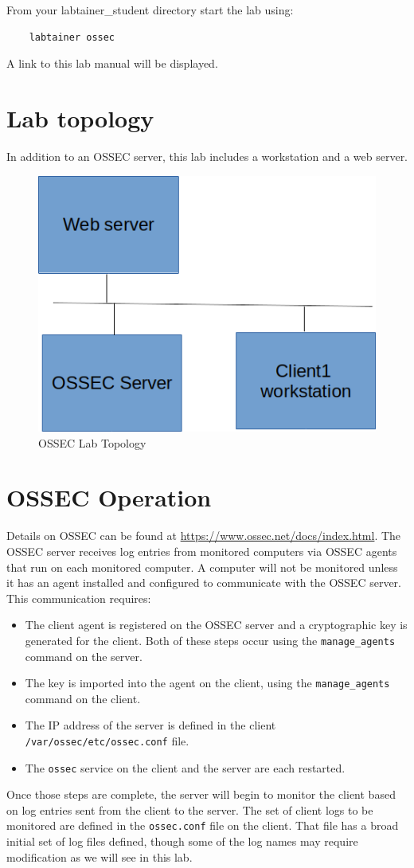 From your labtainer_student directory start the lab using:
\begin{verbatim}
    labtainer ossec
\end{verbatim}
A link to this lab manual will be displayed.

\section{Lab topology}
In addition to an OSSEC server, this lab includes a workstation and a web server.

\begin{figure}[H]
\begin{center}
\includegraphics [width=0.8\linewidth]{ossec.png}
\end{center}
\caption{OSSEC Lab Topology}
\label{fig:topology}
\end{figure}

\section{OSSEC Operation}
Details on OSSEC can be found at \url{https://www.ossec.net/docs/index.html}.
The OSSEC server receives log entries from monitored computers via OSSEC agents that run on each monitored computer.  
A computer will not be monitored unless it has an agent installed and configured to communicate with the OSSEC server.
This communication requires:
\begin{itemize}
\item The client agent is registered on the OSSEC server and a cryptographic key is generated for the client.  Both
of these steps occur using the {\tt manage\_agents} command on the server.
\item The key is imported into the agent on the client, using the {\tt manage\_agents} command on the client.
\item The IP address of the server is defined in the client {\tt /var/ossec/etc/ossec.conf} file.
\item The {\tt ossec} service on the client and the server are each restarted.
\end{itemize}
Once those steps are complete, the server will begin to monitor the client based on log entries sent from the client
to the server.  The set of client logs to be monitored are defined in the {\tt ossec.conf} file on the client.
That file has a broad initial set of log files defined, though some of the log names may require modification as we
will see in this lab.


